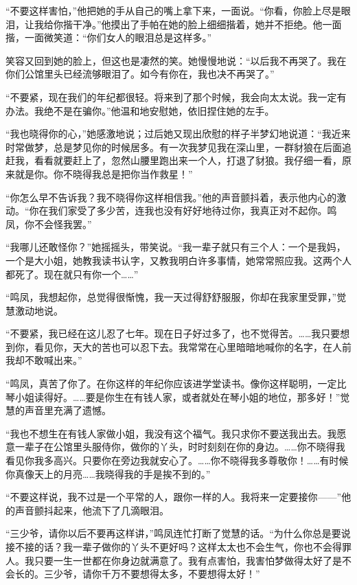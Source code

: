 \par “不要这样害怕，”他把她的手从自己的嘴上拿下来，一面说。“你看，你脸上尽是眼泪，让我给你揩干净。”他摸出了手帕在她的脸上细细揩着，她并不拒绝。他一面揩，一面微笑道：“你们女人的眼泪总是这样多。”
\par 笑容又回到她的脸上，但这也是凄然的笑。她慢慢地说：“以后我不再哭了。我在你们公馆里头已经流够眼泪了。如今有你在，我也决不再哭了。”
\par “不要紧，现在我们的年纪都很轻。将来到了那个时候，我会向太太说。我一定有办法。我绝不是在骗你。”他温和地安慰她，依旧捏住她的左手。
\par “我也晓得你的心，”她感激地说；过后她又现出欣慰的样子半梦幻地说道：“我近来时常做梦，总是梦见你的时候居多。有一次我梦见我在深山里，一群豺狼在后面追赶我，看看就要赶上了，忽然山腰里跑出来一个人，打退了豺狼。我仔细一看，原来就是你。你不晓得我总是把你当作救星！”
\par “你怎么早不告诉我？我不晓得你这样相信我。”他的声音颤抖着，表示他内心的激动。“你在我们家受了多少苦，连我也没有好好地待过你，我真正对不起你。鸣凤，你不会怪我罢。”
\par “我哪儿还敢怪你？”她摇摇头，带笑说。“我一辈子就只有三个人：一个是我妈，一个是大小姐，她教我读书认字，又教我明白许多事情，她常常照应我。这两个人都死了。现在就只有你一个……”
\par “鸣凤，我想起你，总觉得很惭愧，我一天过得舒舒服服，你却在我家里受罪，”觉慧激动地说。
\par “不要紧，我已经在这儿忍了七年。现在日子好过多了，也不觉得苦。……我只要想到你，看见你，天大的苦也可以忍下去。我常常在心里暗暗地喊你的名字，在人前我却不敢喊出来。”
\par “鸣凤，真苦了你了。在你这样的年纪你应该进学堂读书。像你这样聪明，一定比琴小姐读得好。……要是你生在有钱人家，或者就处在琴小姐的地位，那多好！”觉慧的声音里充满了遗憾。
\par “我也不想生在有钱人家做小姐，我没有这个福气。我只求你不要送我出去。我愿意一辈子在公馆里头服侍你，做你的丫头，时时刻刻在你的身边。……你不晓得我看见你我多高兴。只要你在旁边我就安心了。……你不晓得我多尊敬你！……有时候你真像天上的月亮……我晓得我的手是挨不到的。”
\par “不要这样说，我不过是一个平常的人，跟你一样的人。我将来一定要接你——”他的声音颤抖起来，他流下了几滴眼泪。
\par “三少爷，请你以后不要再这样讲，”鸣凤连忙打断了觉慧的话。“为什么你总是要说接不接的话？我一辈子做你的丫头不更好吗？这样太太也不会生气，你也不会得罪人。我只要一生一世都在你身边就满意了。我有点害怕，我害怕梦做得太好了是不会长的。三少爷，请你千万不要想得太多，不要想得太好！”
